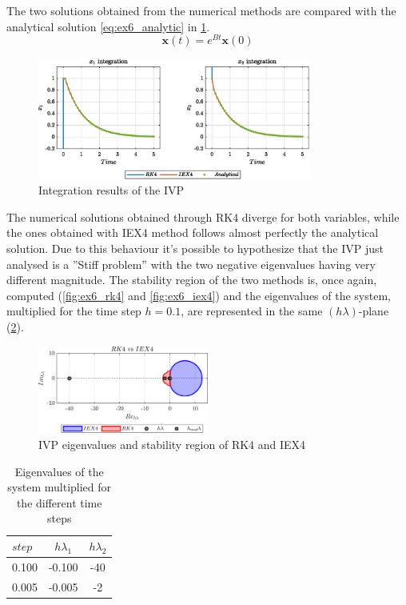 \documentclass[11pt,a4paper,oneside]{article}
\renewcommand{\vec}[1]{\mathbf{#1}}
\begin{document}
The two solutions obtained from the numerical methods are compared with the analytical solution \cref{eq:ex6_analytic} in \cref{fig:ex6_integration}.
\begin{equation}
    \vec{x}(t) = e^{Bt}\vec{x}(0)
    \label{eq:ex6_analytic}
\end{equation}

\begin{figure}[htb]
    \centering
    \includegraphics*[width=0.8\textwidth, keepaspectratio]{ex6_integOutput.eps}
    \caption[]{\label{fig:ex6_integration} Integration results of the IVP}
\end{figure}

The numerical solutions obtained through RK4 diverge for both variables, while the ones obtained with IEX4 method follows almost perfectly the analytical solution.
Due to this behaviour it's possible to hypothesize that the IVP just analysed is a ''Stiff problem'' with the two negative eigenvalues having very different magnitude.
The stability region of the two methods is, once again, computed (\cref{fig:ex6_rk4} and \cref{fig:ex6_iex4}) and the eigenvalues of the system, multiplied for the time step $h=0.1$, are represented in the same $(h\lambda)$-plane (\cref{fig:ex6_stabReg}).  

\begin{figure}[htb]
    \centering
    \includegraphics*[width=0.5\textwidth, keepaspectratio]{ex6_stabReg.png}
    \caption[]{\label{fig:ex6_stabReg} IVP eigenvalues and stability region of RK4 and IEX4}
\end{figure}

\begin{table}[htb]
    \centering
    \caption{Eigenvalues of the system multiplied for the different time steps}
    \label{tab:ex6_eigs}
    \begin{tabular}{lcc}
            \toprule
            \toprule
            $step$&  $h\lambda_1$& $h\lambda_2$ \\ 
            \midrule
            0.100 & -0.100 & -40\\
            0.005 & -0.005 & -2\\
            \bottomrule
            \bottomrule
        \end{tabular}
\end{table}
\end{document}
